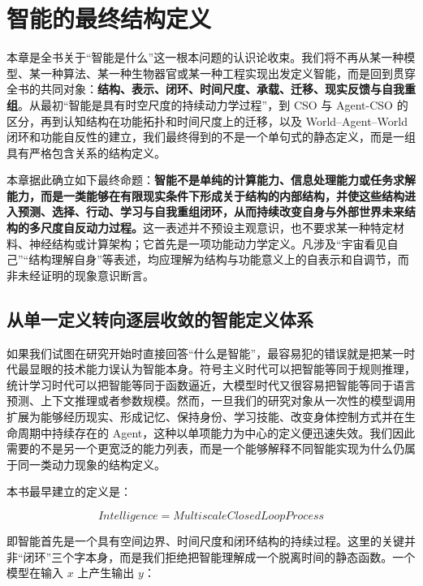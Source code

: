 \chapter{智能的最终结构定义}
\label{chap:intelligence-final-structural-definition}

\begin{chapterlead}
本章是全书关于“智能是什么”这一根本问题的认识论收束。我们将不再从某一种模型、某一种算法、某一种生物器官或某一种工程实现出发定义智能，而是回到贯穿全书的共同对象：\textbf{结构、表示、闭环、时间尺度、承载、迁移、现实反馈与自我重组}。从最初“智能是具有时空尺度的持续动力学过程”，到 CSO 与 Agent-CSO 的区分，再到认知结构在功能拓扑和时间尺度上的迁移，以及 World--Agent--World 闭环和功能自反性的建立，我们最终得到的不是一个单句式的静态定义，而是一组具有严格包含关系的结构定义。

本章据此确立如下最终命题：\textbf{智能不是单纯的计算能力、信息处理能力或任务求解能力，而是一类能够在有限现实条件下形成关于结构的内部结构，并使这些结构进入预测、选择、行动、学习与自我重组闭环，从而持续改变自身与外部世界未来结构的多尺度自反动力过程。}这一表述并不预设主观意识，也不要求某一种特定材料、神经结构或计算架构；它首先是一项功能动力学定义。凡涉及“宇宙看见自己”“结构理解自身”等表述，均应理解为结构与功能意义上的自表示和自调节，而非未经证明的现象意识断言。
\end{chapterlead}



\section{从单一定义转向逐层收敛的智能定义体系}

如果我们试图在研究开始时直接回答“什么是智能”，最容易犯的错误就是把某一时代最显眼的技术能力误认为智能本身。符号主义时代可以把智能等同于规则推理，统计学习时代可以把智能等同于函数逼近，大模型时代又很容易把智能等同于语言预测、上下文推理或者参数规模。然而，一旦我们的研究对象从一次性的模型调用扩展为能够经历现实、形成记忆、保持身份、学习技能、改变身体控制方式并在生命周期中持续存在的 Agent，这种以单项能力为中心的定义便迅速失效。我们因此需要的不是另一个更宽泛的能力列表，而是一个能够解释不同智能实现为什么仍属于同一类动力现象的结构定义。

本书最早建立的定义是：

\[
\boxed{
Intelligence
=
MultiscaleClosedLoopProcess
}
\]

即智能首先是一个具有空间边界、时间尺度和闭环结构的持续过程。这里的关键并非“闭环”三个字本身，而是我们拒绝把智能理解成一个脱离时间的静态函数。一个模型在输入 \(x\) 上产生输出 \(y\)：

